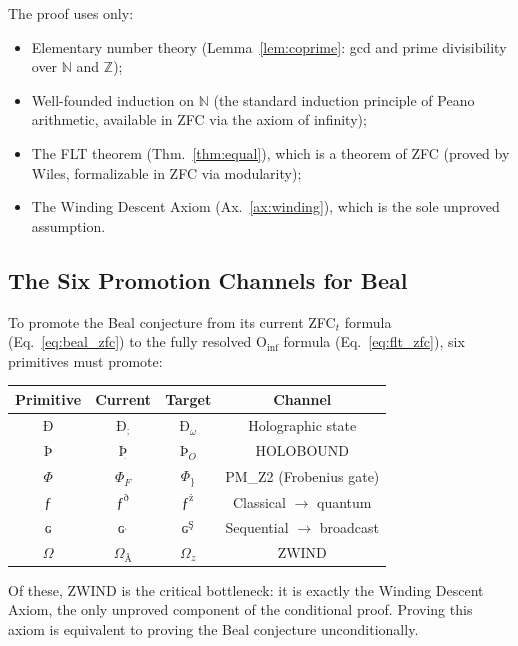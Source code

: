 \documentclass[12pt]{article}
\begin{document}
The proof uses only:
\begin{itemize}
\item Elementary number theory (Lemma~\ref{lem:coprime}: gcd and prime
      divisibility over $\mathbb{N}$ and $\mathbb{Z}$);
\item Well-founded induction on $\mathbb{N}$ (the standard induction
      principle of Peano arithmetic, available in ZFC via the
      axiom of infinity);
\item The FLT theorem (Thm.~\ref{thm:equal}), which is a theorem of ZFC
      (proved by Wiles, formalizable in ZFC via modularity);
\item The Winding Descent Axiom (Ax.~\ref{ax:winding}), which is the
      sole unproved assumption.
\end{itemize}

\subsection{The Six Promotion Channels for Beal}

To promote the Beal conjecture from its current ZFC${}_t$ formula
(Eq.~\ref{eq:beal_zfc}) to the fully resolved O${}_{\text{inf}}$
formula (Eq.~\ref{eq:flt_zfc}), six primitives must promote:

\begin{center}
\begin{tabular}{c|c|c|c}
Primitive & Current & Target & Channel \\
\hline
$\text{Ð}$ & $\text{Ð}_;$ & $\text{Ð}_{\omega}$ & Holographic state \\
$\text{Þ}$ & $\text{Þ}_{\ddot{}}$ & $\text{Þ}_O$ & HOLOBOUND \\
$\Phi$ & $\Phi_F$ & $\Phi_{\text{\}}}$ & PM\_Z2 (Frobenius gate) \\
$\text{ƒ}$ & $\text{ƒ}^{\text{ð}}$ & $\text{ƒ}^{\text{ż}}$ & Classical $\to$ quantum \\
$\text{ɢ}$ & $\text{ɢ}^{ˌ}$ & $\text{ɢ}^{\text{Ş}}$ & Sequential $\to$ broadcast \\
$\Omega$ & $\Omega_{\text{Å}}$ & $\Omega_z$ & ZWIND \\
\end{tabular}
\end{center}

Of these, ZWIND is the critical bottleneck: it is exactly the
Winding Descent Axiom, the only unproved component of the
conditional proof. Proving this axiom is equivalent to proving
the Beal conjecture unconditionally.
\end{document}

